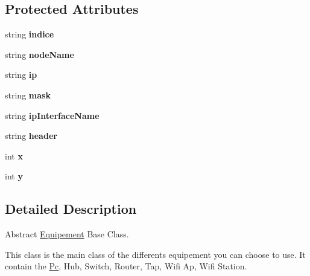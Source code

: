 \subsection*{Protected Attributes}
\begin{CompactItemize}
\item 
\hypertarget{class_equipement_ec95b838f91d98d398dde98accf4497d}{
string \textbf{indice}}
\label{class_equipement_ec95b838f91d98d398dde98accf4497d}

\item 
\hypertarget{class_equipement_5d2cf4f72cf7bd3a198077f415a3e68c}{
string \textbf{nodeName}}
\label{class_equipement_5d2cf4f72cf7bd3a198077f415a3e68c}

\item 
\hypertarget{class_equipement_37cc4e52331e4dba94a2548d821de8ac}{
string \textbf{ip}}
\label{class_equipement_37cc4e52331e4dba94a2548d821de8ac}

\item 
\hypertarget{class_equipement_d745163018b1455f5864b0cf117b12ec}{
string \textbf{mask}}
\label{class_equipement_d745163018b1455f5864b0cf117b12ec}

\item 
\hypertarget{class_equipement_61f3305527e060ba78a24a54a103d0a5}{
string \textbf{ipInterfaceName}}
\label{class_equipement_61f3305527e060ba78a24a54a103d0a5}

\item 
\hypertarget{class_equipement_7fb3c47443ad0a0d58ba7965691db73f}{
string \textbf{header}}
\label{class_equipement_7fb3c47443ad0a0d58ba7965691db73f}

\item 
\hypertarget{class_equipement_45ae2acbe57b1a47e7e9eeed67738109}{
int \textbf{x}}
\label{class_equipement_45ae2acbe57b1a47e7e9eeed67738109}

\item 
\hypertarget{class_equipement_de92f12b5da5dde6f2b43921789cf676}{
int \textbf{y}}
\label{class_equipement_de92f12b5da5dde6f2b43921789cf676}

\end{CompactItemize}


\subsection{Detailed Description}
Abstract \hyperlink{class_equipement}{Equipement} Base Class. 

This class is the main class of the differents equipement you can choose to use. It contain the \hyperlink{class_pc}{Pc}, Hub, Switch, Router, Tap, Wifi Ap, Wifi Station. 


